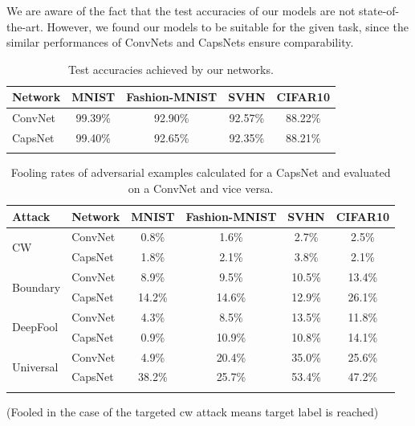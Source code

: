 \documentclass{article}
\begin{document}
We are aware of the fact that the test accuracies of our models are not state-of-the-art. However, we found our models to be suitable for the given task, since the similar performances of ConvNets and CapsNets ensure comparability.

\begin{table}[h]
	\caption{Test accuracies achieved by our networks.}
	\vskip 0.15in
	\centering
	\begin{tabular}{lcccc}
		\toprule
		Network       & MNIST & Fashion-MNIST & SVHN & CIFAR10  \\
		\midrule
		ConvNet           & 99.39\% & 92.90\% & 92.57\% & 88.22\% \\
		CapsNet           & 99.40\% & 92.65\% & 92.35\% & 88.21\% \\
		\bottomrule\\
	\end{tabular}
	\label{tab:accuracies}
\end{table}

\begin{table}[h]
	\caption{Fooling rates of adversarial examples calculated for a CapsNet and evaluated on a ConvNet and vice versa.}
	\vskip 0.15in
	\centering
	\begin{tabular}{llcccc}
		\toprule
		Attack & Network       & MNIST & Fashion-MNIST & SVHN & CIFAR10  \\
		\midrule
		\multirow{2}{*}{CW} & ConvNet & 0.8\% & 1.6\% & 2.7\% & 2.5\% \\
		& CapsNet            & 1.8\% & 2.1\% & 3.8\% & 2.1\% \\
		\midrule
		\multirow{2}{*}{Boundary} & ConvNet & 8.9\% & 9.5\% & 10.5\% & 13.4\% \\
		& CapsNet            & 14.2\% & 14.6\% & 12.9\% & 26.1\% \\
		\midrule
		\multirow{2}{*}{DeepFool} & ConvNet & 4.3\% & 8.5\% & 13.5\% & 11.8\% \\
		& CapsNet           & 0.9\% & 10.9\% & 10.8\% & 14.1\% \\
		\midrule
		\multirow{2}{*}{Universal} & ConvNet & 4.9\% & 20.4\% & 35.0\% & 25.6\% \\
		& CapsNet           & 38.2\% & 25.7\% & 53.4\% & 47.2\% \\
		\bottomrule\\
	\end{tabular}
	\label{tab:attacks}
\end{table}

(Fooled in the case of the targeted cw attack means target label is reached)
\end{document}
